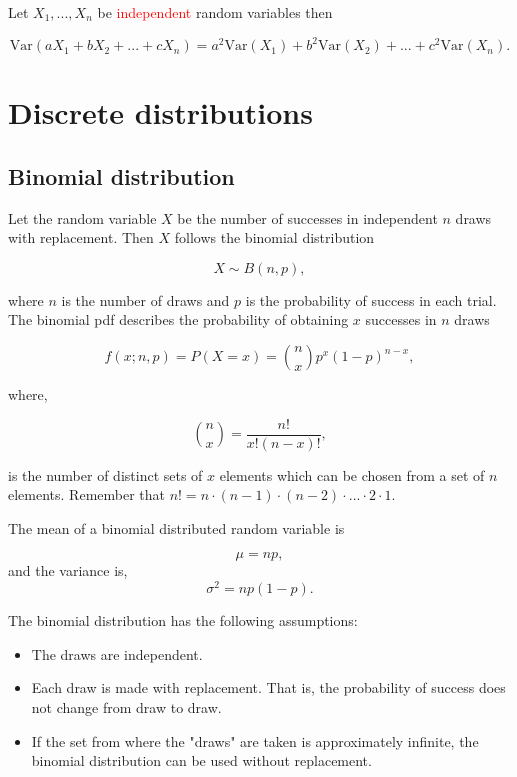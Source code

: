 Let $X_1, ... , X_n$ be \textcolor{red}{independent} random variables then

\begin{equation}
    \text{Var}(aX_1 + bX_2 + ... + cX_n) = a^2\text{Var}(X_1) + b^2\text{Var}(X_2) + ... + c^2\text{Var}(X_n).
\end{equation}

\section{Discrete distributions}


\subsection{Binomial distribution}

Let the random variable $X$ be the number of successes in independent $n$ draws with replacement. Then $X$ follows the binomial distribution

\begin{equation}
X \sim B(n,p),
\end{equation}

where $n$ is the number of draws and $p$ is the probability of success in each trial. The binomial pdf describes the probability of obtaining $x$ successes in $n$ draws

\begin{equation}
f(x;n,p) = P(X=x) = \binom{n}{x} p^x (1-p)^{n-x},
\end{equation}

where,

\begin{equation}
\binom{n}{x} = \frac{n!}{x!(n-x)!},
\end{equation}

is the number of distinct sets of $x$ elements which can be chosen from a set of $n$ elements. Remember that $n! = n \cdot (n-1) \cdot (n-2) \cdot ... \cdot 2 \cdot 1$.

The mean of a binomial distributed random variable is

\begin{equation}
\mu = np,
\end{equation}
and the variance is,
\begin{equation}
\sigma^2 = np(1-p).
\end{equation}


\begin{highlight}
    The binomial distribution has the following assumptions:
\begin{itemize}
    \item The draws are independent.
    \item Each draw is made with replacement. That is, the probability of success does not change from draw to draw.
    \item If the set from where the "draws" are taken is approximately infinite, the binomial distribution can be used without replacement. 
\end{itemize}
\end{highlight}


